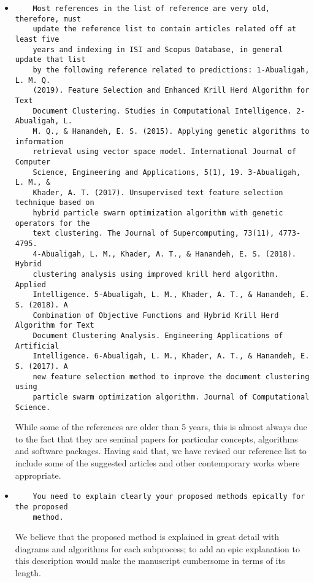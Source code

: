 \documentclass[11pt]{article}
\begin{document}
\begin{itemize}
\item
\begin{verbatim}
    Most references in the list of reference are very old, therefore, must
    update the reference list to contain articles related off at least five
    years and indexing in ISI and Scopus Database, in general update that list
    by the following reference related to predictions: 1-Abualigah, L. M. Q.
    (2019). Feature Selection and Enhanced Krill Herd Algorithm for Text
    Document Clustering. Studies in Computational Intelligence. 2-Abualigah, L.
    M. Q., & Hanandeh, E. S. (2015). Applying genetic algorithms to information
    retrieval using vector space model. International Journal of Computer
    Science, Engineering and Applications, 5(1), 19. 3-Abualigah, L. M., &
    Khader, A. T. (2017). Unsupervised text feature selection technique based on
    hybrid particle swarm optimization algorithm with genetic operators for the
    text clustering. The Journal of Supercomputing, 73(11), 4773-4795.
    4-Abualigah, L. M., Khader, A. T., & Hanandeh, E. S. (2018). Hybrid
    clustering analysis using improved krill herd algorithm. Applied
    Intelligence. 5-Abualigah, L. M., Khader, A. T., & Hanandeh, E. S. (2018). A
    Combination of Objective Functions and Hybrid Krill Herd Algorithm for Text
    Document Clustering Analysis. Engineering Applications of Artificial
    Intelligence. 6-Abualigah, L. M., Khader, A. T., & Hanandeh, E. S. (2017). A
    new feature selection method to improve the document clustering using
    particle swarm optimization algorithm. Journal of Computational Science.
\end{verbatim}

While some of the references are older than 5 years, this is almost always due
to the fact that they are seminal papers for particular concepts, algorithms and
software packages. Having said that, we have revised our reference list to
include some of the suggested articles and other contemporary works where
appropriate.


\item
\begin{verbatim}
    You need to explain clearly your proposed methods epically for the proposed
    method.
\end{verbatim}

We believe that the proposed method is explained in great detail with diagrams
and algorithms for each subprocess; to add an epic explanation to this
description would make the manuscript cumbersome in terms of its length.


\end{itemize}
\end{document}
